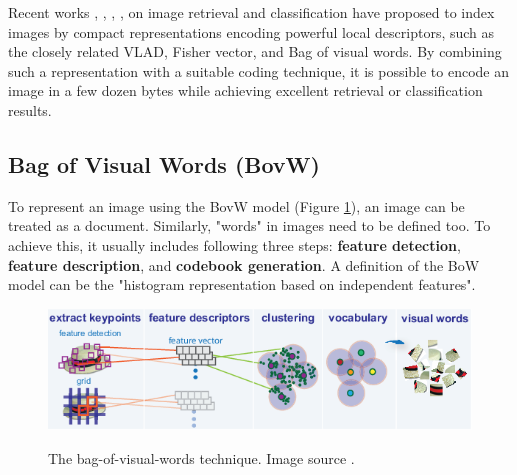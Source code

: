 \documentclass[12pt]{article}
\numberwithin{equation}{section}
\numberwithin{table}{section}
\numberwithin{figure}{section}
\begin{document}
Recent works \cite{Arandjelovic2013}, \cite{Delhumeau2013}, \cite{Sanchez2013}, \cite{Singh2012}, \cite{Ke2003} on image retrieval and classification have proposed to index images by compact representations encoding powerful local descriptors, such as the closely related VLAD,  Fisher vector, and Bag of visual words. By combining such a representation with a suitable coding technique, it is possible to encode an image in a few dozen bytes while achieving excellent retrieval or classification results. 

\subsection{Bag of Visual Words (BovW)} \label{bow}

To represent an image using the BovW model (Figure \ref{boww}), an image can be treated as a document. Similarly, "words" in images need to be defined too. To achieve this, it usually includes following three steps: \textbf{feature detection}, \textbf{feature description}, and \textbf{codebook generation}. A definition of the BoW model can be the "histogram representation based on independent features".

\begin{figure}[H] \centering
	\caption{The bag-of-visual-words technique. Image source \cite{mathw}. }
	\includegraphics[width=1\textwidth]{bagoffeatures_visualwordsoverview.png}
	\label{boww}
\end{figure}
\end{document}
